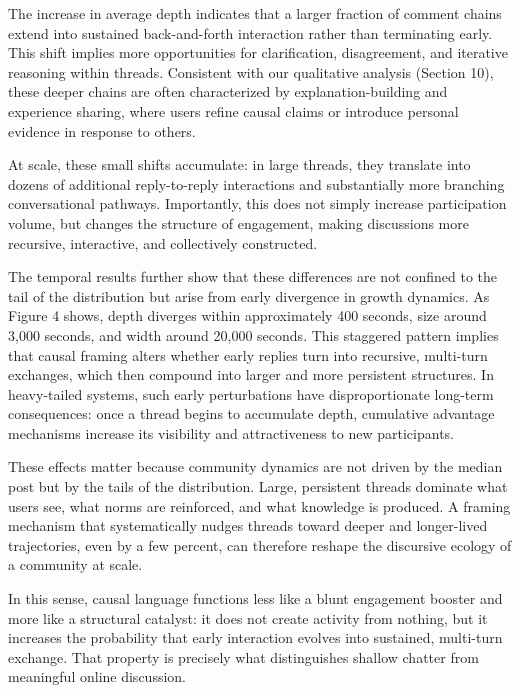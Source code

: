 \documentclass[acmsmall]{acmart}
\begin{document}
The increase in average depth indicates that a larger fraction of comment chains extend into sustained back-and-forth interaction rather than terminating early. This shift implies more opportunities for clarification, disagreement, and iterative reasoning within threads. Consistent with our qualitative analysis (Section 10), these deeper chains are often characterized by explanation-building and experience sharing, where users refine causal claims or introduce personal evidence in response to others.

At scale, these small shifts accumulate: in large threads, they translate into dozens of additional reply-to-reply interactions and substantially more branching conversational pathways. Importantly, this does not simply increase participation volume, but changes the structure of engagement, making discussions more recursive, interactive, and collectively constructed.


The temporal results further show that these differences are not confined to the tail of the distribution but arise from early divergence in growth dynamics. As Figure 4 shows, depth diverges within approximately 400 seconds, size around 3,000 seconds, and width around 20,000 seconds. This staggered pattern implies that causal framing alters whether early replies turn into recursive, multi-turn exchanges, which then compound into larger and more persistent structures. In heavy-tailed systems, such early perturbations have disproportionate long-term consequences: once a thread begins to accumulate depth, cumulative advantage mechanisms increase its visibility and attractiveness to new participants.


These effects matter because community dynamics are not driven by the median post but by the tails of the distribution. Large, persistent threads dominate what users see, what norms are reinforced, and what knowledge is produced. A framing mechanism that systematically nudges threads toward deeper and longer-lived trajectories, even by a few percent, can therefore reshape the discursive ecology of a community at scale.

In this sense, causal language functions less like a blunt engagement booster and more like a structural catalyst: it does not create activity from nothing, but it increases the probability that early interaction evolves into sustained, multi-turn exchange. That property is precisely what distinguishes shallow chatter from meaningful online discussion.
\end{document}
